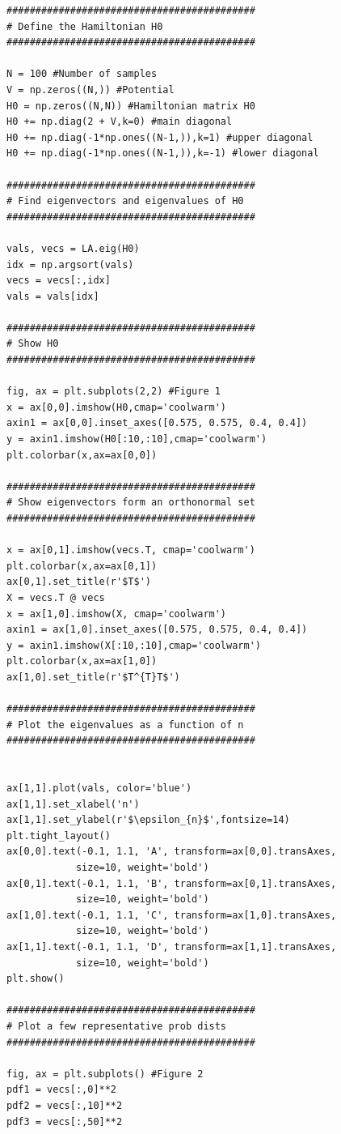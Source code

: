 \documentclass[12pt]{article}
\theoremstyle{definition}
\begin{document}
{\begin{lstlisting}
###########################################
# Define the Hamiltonian H0
###########################################

N = 100 #Number of samples
V = np.zeros((N,)) #Potential
H0 = np.zeros((N,N)) #Hamiltonian matrix H0
H0 += np.diag(2 + V,k=0) #main diagonal
H0 += np.diag(-1*np.ones((N-1,)),k=1) #upper diagonal
H0 += np.diag(-1*np.ones((N-1,)),k=-1) #lower diagonal

###########################################
# Find eigenvectors and eigenvalues of H0
###########################################

vals, vecs = LA.eig(H0)
idx = np.argsort(vals)
vecs = vecs[:,idx]
vals = vals[idx]

###########################################
# Show H0
###########################################

fig, ax = plt.subplots(2,2) #Figure 1
x = ax[0,0].imshow(H0,cmap='coolwarm')
axin1 = ax[0,0].inset_axes([0.575, 0.575, 0.4, 0.4])
y = axin1.imshow(H0[:10,:10],cmap='coolwarm')
plt.colorbar(x,ax=ax[0,0])

###########################################
# Show eigenvectors form an orthonormal set
###########################################

x = ax[0,1].imshow(vecs.T, cmap='coolwarm')
plt.colorbar(x,ax=ax[0,1])
ax[0,1].set_title(r'$T$')
X = vecs.T @ vecs
x = ax[1,0].imshow(X, cmap='coolwarm')
axin1 = ax[1,0].inset_axes([0.575, 0.575, 0.4, 0.4])
y = axin1.imshow(X[:10,:10],cmap='coolwarm')
plt.colorbar(x,ax=ax[1,0])
ax[1,0].set_title(r'$T^{T}T$')

###########################################
# Plot the eigenvalues as a function of n
###########################################


ax[1,1].plot(vals, color='blue')
ax[1,1].set_xlabel('n')
ax[1,1].set_ylabel(r'$\epsilon_{n}$',fontsize=14)
plt.tight_layout()
ax[0,0].text(-0.1, 1.1, 'A', transform=ax[0,0].transAxes, 
            size=10, weight='bold')
ax[0,1].text(-0.1, 1.1, 'B', transform=ax[0,1].transAxes, 
            size=10, weight='bold')
ax[1,0].text(-0.1, 1.1, 'C', transform=ax[1,0].transAxes, 
            size=10, weight='bold')
ax[1,1].text(-0.1, 1.1, 'D', transform=ax[1,1].transAxes, 
            size=10, weight='bold')
plt.show()

###########################################
# Plot a few representative prob dists
###########################################

fig, ax = plt.subplots() #Figure 2
pdf1 = vecs[:,0]**2
pdf2 = vecs[:,10]**2
pdf3 = vecs[:,50]**2


\end{lstlisting}}
\end{document}
